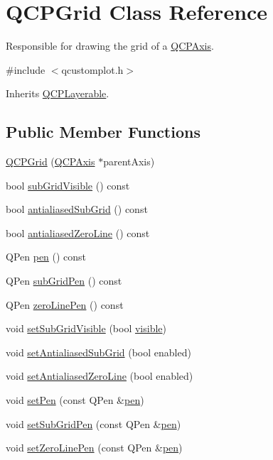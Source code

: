 \hypertarget{class_q_c_p_grid}{\section{Q\-C\-P\-Grid Class Reference}
\label{class_q_c_p_grid}
}


Responsible for drawing the grid of a \hyperlink{class_q_c_p_axis}{Q\-C\-P\-Axis}.  




{\ttfamily \#include $<$qcustomplot.\-h$>$}



Inherits \hyperlink{class_q_c_p_layerable}{Q\-C\-P\-Layerable}.

\subsection*{Public Member Functions}
\begin{DoxyCompactItemize}
\item 
\hyperlink{class_q_c_p_grid_acd1cdd2909625388a13048b698494a17}{Q\-C\-P\-Grid} (\hyperlink{class_q_c_p_axis}{Q\-C\-P\-Axis} $\ast$parent\-Axis)
\item 
bool \hyperlink{class_q_c_p_grid_a0a8963e384d53cd77cbab7df96147458}{sub\-Grid\-Visible} () const 
\item 
bool \hyperlink{class_q_c_p_grid_abfa6c638a05b45b2ed31b680fc9b31fc}{antialiased\-Sub\-Grid} () const 
\item 
bool \hyperlink{class_q_c_p_grid_a4dfbc1cee989d8cae1434b765ab2a13b}{antialiased\-Zero\-Line} () const 
\item 
Q\-Pen \hyperlink{class_q_c_p_grid_aca20b67548e3ae31fd02e6398ffd6cb9}{pen} () const 
\item 
Q\-Pen \hyperlink{class_q_c_p_grid_ac698f8c6864b1d8f0e2af97ca4b39cc6}{sub\-Grid\-Pen} () const 
\item 
Q\-Pen \hyperlink{class_q_c_p_grid_a06ea986b651860446e1224d2097259b9}{zero\-Line\-Pen} () const 
\item 
void \hyperlink{class_q_c_p_grid_ad4ad6bf714ec45e08845456355a1b700}{set\-Sub\-Grid\-Visible} (bool \hyperlink{class_q_c_p_layerable_a10a3cc92e0fa63e4a929e61d34e275a7}{visible})
\item 
void \hyperlink{class_q_c_p_grid_a5692310ba183721a413d60951407d114}{set\-Antialiased\-Sub\-Grid} (bool enabled)
\item 
void \hyperlink{class_q_c_p_grid_a3cc6d54647393ee71afb6da56af07aa4}{set\-Antialiased\-Zero\-Line} (bool enabled)
\item 
void \hyperlink{class_q_c_p_grid_aa05ab9816ffb440908171e45e833b593}{set\-Pen} (const Q\-Pen \&\hyperlink{class_q_c_p_grid_aca20b67548e3ae31fd02e6398ffd6cb9}{pen})
\item 
void \hyperlink{class_q_c_p_grid_a9edd3593f384d1f0b0202a39cef4453d}{set\-Sub\-Grid\-Pen} (const Q\-Pen \&\hyperlink{class_q_c_p_grid_aca20b67548e3ae31fd02e6398ffd6cb9}{pen})
\item 
void \hyperlink{class_q_c_p_grid_a209f40fdb252397b418b82d3494d8ea0}{set\-Zero\-Line\-Pen} (const Q\-Pen \&\hyperlink{class_q_c_p_grid_aca20b67548e3ae31fd02e6398ffd6cb9}{pen})
\end{DoxyCompactItemize}
